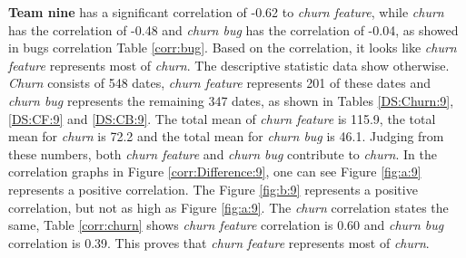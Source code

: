 \documentclass[UKenglish]{ifimaster}  %
\begin{document}
\textbf{Team nine} has a significant correlation of -0.62 to \textit{churn feature}, while \textit{churn} has the correlation of -0.48 and \textit{churn bug} has the correlation of -0.04, as showed in bugs correlation Table \ref{corr:bug}. Based on the correlation, it looks like \textit{churn feature} represents most of \textit{churn}. The descriptive statistic data show otherwise. \textit{Churn} consists of 548 dates, \textit{churn feature} represents 201 of these dates and \textit{churn bug} represents the remaining 347 dates, as shown in Tables \ref{DS:Churn:9}, \ref{DS:CF:9} and \ref{DS:CB:9}.  The total mean of \textit{churn feature} is 115.9, the total mean for \textit{churn} is 72.2 and the total mean for \textit{churn bug} is 46.1. Judging from these numbers, both \textit{churn feature} and \textit{churn bug} contribute to \textit{churn}. In the correlation graphs in Figure \ref{corr:Difference:9}, one can see Figure \ref{fig:a:9} represents a positive correlation. The Figure \ref{fig:b:9} represents a positive correlation, but not as high as Figure \ref{fig:a:9}. The \textit{churn} correlation states the same,  Table \ref{corr:churn} shows \textit{churn feature} correlation is 0.60 and \textit{churn bug} correlation is 0.39. This proves that \textit{churn feature} represents most of \textit{churn}.
\end{document}
